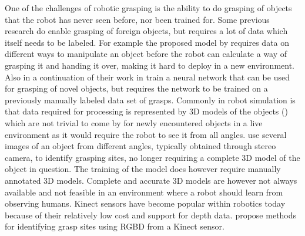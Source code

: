 One of the challenges of robotic grasping is the ability to do grasping of objects that the robot has never seen before, nor been trained for. Some previous research do enable grasping of foreign objects, but requires a lot of data which itself needs to be labeled. For example the proposed model by \textcite{Chan2014} requires data on different ways to manipulate an object before the robot can calculate a way of grasping it and handing it over, making it hard to deploy in a new environment. Also \textcite{Huebner2008a} in a continuation of their work in \parencite{Huebner2008} train a neural network that can be used for grasping of novel objects, but requires the network to be trained on a previously manually labeled data set of grasps. Commonly in robot simulation is that data required for processing is represented by 3D models of the objects (\parencite{Miller2003}) which are not trivial to come by for newly encountered objects in a live environment as it would require the robot to see it from all angles. \textcite{Saxena2008} use several images of an object from different angles, typically obtained through stereo camera, to identify grasping sites, no longer requiring a complete 3D model of the object in question. The training of the model does however require manually annotated 3D models. Complete and accurate 3D models are however not always available and not feasible in an environment where a robot should learn from observing humans. Kinect sensors have become popular within robotics today because of their relatively low cost and support for depth data. \parencite{Lenz2015} \parencite{Redmon2014} \parencite{Jiang2011} propose methods for identifying grasp sites using RGBD from a Kinect sensor.

